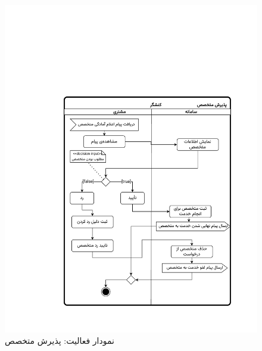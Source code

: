 \begin{figure}[ht!]
	\centering
	\includegraphics[scale=0.8, page=1]{figs/OOD-activity-acceptspec.pdf}
	\caption{نمودار فعالیت: پذیرش متخصص}
\end{figure}
\FloatBarrier
\newpage

